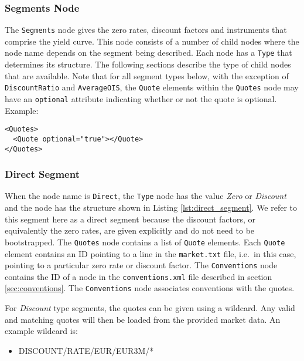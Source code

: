 \subsubsection*{Segments Node} \label{ss:segments_node}
The \lstinline!Segments! node gives the zero rates, discount factors and instruments that comprise the yield curve. This
node consists of a number of child nodes where the node name depends on the segment being described. Each node has a
\lstinline!Type! that determines its structure. The following sections describe the type of child nodes that are
available. Note that for all segment types below, with the exception of \lstinline!DiscountRatio! and \lstinline!AverageOIS!, the 
\lstinline!Quote! elements within the \lstinline!Quotes! node may have an \lstinline!optional! attribute indicating whether or
not the quote is optional. Example:
\begin{verbatim}
<Quotes>
  <Quote optional="true"></Quote>
</Quotes>
\end{verbatim}

\subsubsection*{Direct Segment}
When the node name is \lstinline!Direct!, the \lstinline!Type! node has the value \emph{Zero} or \emph{Discount} and the
node has the structure shown in Listing \ref{lst:direct_segment}. We refer to this segment here as a direct segment
because the discount factors, or equivalently the zero rates, are given explicitly and do not need to be
bootstrapped. The \lstinline!Quotes! node contains a list of \lstinline!Quote! elements. Each \lstinline!Quote! element
contains an ID pointing to a line in the {\tt market.txt} file, i.e.\ in this case, pointing to a particular zero rate
or discount factor. The \lstinline!Conventions! node contains the ID of a node in the {\tt conventions.xml} file
described in section \ref{sec:conventions}. The \lstinline!Conventions! node associates conventions with the quotes.

For \emph{Discount} type segments, the quotes can be given using a wildcard. Any valid and matching quotes will then be loaded from the provided market data. An example wildcard is:
\begin{itemize}
  \item {DISCOUNT/RATE/EUR/EUR3M/*}
\end{itemize}


